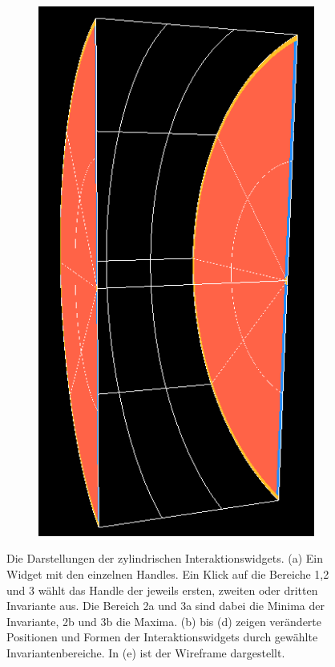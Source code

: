 \documentclass[a4paper,fontsize=12pt,toc=bib,halfparskip]{scrartcl}
\begin{document}
\begin{figure}
\begin{subfigure}{0.15\textwidth}
		\includegraphics[width=\textwidth]{pictures/InteractionPlanes5.png}
		\subcaption{}
		\label{InteractionPlaneE}
	\end{subfigure}
	\hspace*{\fill}
	\caption{Die Darstellungen der zylindrischen Interaktionswidgets. (a) Ein Widget mit den einzelnen Handles. Ein Klick auf die Bereiche 1,2 und 3 w\"ahlt das Handle der jeweils ersten, zweiten oder dritten Invariante aus. Die Bereich 2a und 3a sind dabei die Minima der Invariante, 2b und 3b die Maxima. (b) bis (d) zeigen ver\"anderte Positionen und Formen der Interaktionswidgets durch gew\"ahlte Invariantenbereiche. In (e) ist der Wireframe dargestellt.}
\end{figure}
\end{document}
